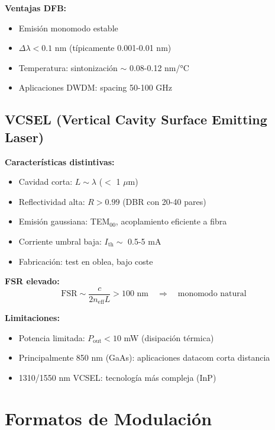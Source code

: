 \documentclass[11pt,a4paper]{article}
\begin{document}
\textbf{Ventajas DFB:}
\begin{itemize}
    \item Emisión monomodo estable
    \item $\Delta\lambda < 0.1$ nm (típicamente 0.001-0.01 nm)
    \item Temperatura: sintonización $\sim$ 0.08-0.12 nm/°C
    \item Aplicaciones DWDM: spacing 50-100 GHz
\end{itemize}

\subsection{VCSEL (Vertical Cavity Surface Emitting Laser)}

\textbf{Características distintivas:}
\begin{itemize}
    \item Cavidad corta: $L \sim \lambda$ ($<$ 1 $\mu$m)
    \item Reflectividad alta: $R > 0.99$ (DBR con 20-40 pares)
    \item Emisión gaussiana: TEM$_{00}$, acoplamiento eficiente a fibra
    \item Corriente umbral baja: $I_{\text{th}} \sim$ 0.5-5 mA
    \item Fabricación: test en oblea, bajo coste
\end{itemize}

\textbf{FSR elevado:}
\begin{equation}
    \text{FSR} \sim \frac{c}{2n_{\text{eff}}L} > 100 \text{ nm} \quad \Rightarrow \quad \text{monomodo natural}
\end{equation}

\textbf{Limitaciones:}
\begin{itemize}
    \item Potencia limitada: $P_{\text{out}} < 10$ mW (disipación térmica)
    \item Principalmente 850 nm (GaAs): aplicaciones datacom corta distancia
    \item 1310/1550 nm VCSEL: tecnología más compleja (InP)
\end{itemize}

\section{Formatos de Modulación}
\end{document}
